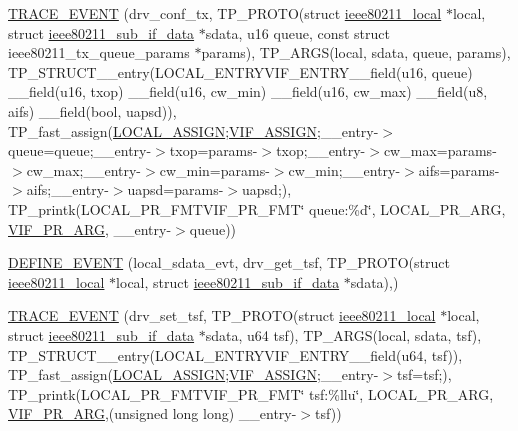 \begin{DoxyCompactItemize}
\item 
\hyperlink{driver-trace_8h_a265d8e79b7ac25833ed08a37b9bf0966}{T\-R\-A\-C\-E\-\_\-\-E\-V\-E\-N\-T} (drv\-\_\-conf\-\_\-tx, T\-P\-\_\-\-P\-R\-O\-T\-O(struct \hyperlink{structieee80211__local}{ieee80211\-\_\-local} $\ast$local, struct \hyperlink{structieee80211__sub__if__data}{ieee80211\-\_\-sub\-\_\-if\-\_\-data} $\ast$sdata, u16 queue, const struct ieee80211\-\_\-tx\-\_\-queue\-\_\-params $\ast$params), T\-P\-\_\-\-A\-R\-G\-S(local, sdata, queue, params), T\-P\-\_\-\-S\-T\-R\-U\-C\-T\-\_\-\-\_\-entry(L\-O\-C\-A\-L\-\_\-\-E\-N\-T\-R\-Y\-V\-I\-F\-\_\-\-E\-N\-T\-R\-Y\-\_\-\-\_\-field(u16, queue) \-\_\-\-\_\-field(u16, txop) \-\_\-\-\_\-field(u16, cw\-\_\-min) \-\_\-\-\_\-field(u16, cw\-\_\-max) \-\_\-\-\_\-field(u8, aifs) \-\_\-\-\_\-field(bool, uapsd)), T\-P\-\_\-fast\-\_\-assign(\hyperlink{driver-trace_8h_ab19d9141887ea92ef9640df06a51e0a1}{L\-O\-C\-A\-L\-\_\-\-A\-S\-S\-I\-G\-N};\hyperlink{driver-trace_8h_af5ede80f04ffcb3f644f68837b1d252c}{V\-I\-F\-\_\-\-A\-S\-S\-I\-G\-N};\-\_\-\-\_\-entry-\/$>$queue=queue;\-\_\-\-\_\-entry-\/$>$txop=params-\/$>$txop;\-\_\-\-\_\-entry-\/$>$cw\-\_\-max=params-\/$>$cw\-\_\-max;\-\_\-\-\_\-entry-\/$>$cw\-\_\-min=params-\/$>$cw\-\_\-min;\-\_\-\-\_\-entry-\/$>$aifs=params-\/$>$aifs;\-\_\-\-\_\-entry-\/$>$uapsd=params-\/$>$uapsd;), T\-P\-\_\-printk(L\-O\-C\-A\-L\-\_\-\-P\-R\-\_\-\-F\-M\-T\-V\-I\-F\-\_\-\-P\-R\-\_\-\-F\-M\-T\char`\"{} queue\-:\%d\char`\"{}, L\-O\-C\-A\-L\-\_\-\-P\-R\-\_\-\-A\-R\-G, \hyperlink{driver-trace_8h_a12c9f3afcd1c461f7ae2f86fd8503977}{V\-I\-F\-\_\-\-P\-R\-\_\-\-A\-R\-G}, \-\_\-\-\_\-entry-\/$>$queue))
\item 
\hyperlink{driver-trace_8h_ae6e1a3e3d22b2d68d7fc06995184e8b7}{D\-E\-F\-I\-N\-E\-\_\-\-E\-V\-E\-N\-T} (local\-\_\-sdata\-\_\-evt, drv\-\_\-get\-\_\-tsf, T\-P\-\_\-\-P\-R\-O\-T\-O(struct \hyperlink{structieee80211__local}{ieee80211\-\_\-local} $\ast$local, struct \hyperlink{structieee80211__sub__if__data}{ieee80211\-\_\-sub\-\_\-if\-\_\-data} $\ast$sdata),)
\item 
\hyperlink{driver-trace_8h_a750f24e8bcbbeb7ae5d18da826edb7b0}{T\-R\-A\-C\-E\-\_\-\-E\-V\-E\-N\-T} (drv\-\_\-set\-\_\-tsf, T\-P\-\_\-\-P\-R\-O\-T\-O(struct \hyperlink{structieee80211__local}{ieee80211\-\_\-local} $\ast$local, struct \hyperlink{structieee80211__sub__if__data}{ieee80211\-\_\-sub\-\_\-if\-\_\-data} $\ast$sdata, u64 tsf), T\-P\-\_\-\-A\-R\-G\-S(local, sdata, tsf), T\-P\-\_\-\-S\-T\-R\-U\-C\-T\-\_\-\-\_\-entry(L\-O\-C\-A\-L\-\_\-\-E\-N\-T\-R\-Y\-V\-I\-F\-\_\-\-E\-N\-T\-R\-Y\-\_\-\-\_\-field(u64, tsf)), T\-P\-\_\-fast\-\_\-assign(\hyperlink{driver-trace_8h_ab19d9141887ea92ef9640df06a51e0a1}{L\-O\-C\-A\-L\-\_\-\-A\-S\-S\-I\-G\-N};\hyperlink{driver-trace_8h_af5ede80f04ffcb3f644f68837b1d252c}{V\-I\-F\-\_\-\-A\-S\-S\-I\-G\-N};\-\_\-\-\_\-entry-\/$>$tsf=tsf;), T\-P\-\_\-printk(L\-O\-C\-A\-L\-\_\-\-P\-R\-\_\-\-F\-M\-T\-V\-I\-F\-\_\-\-P\-R\-\_\-\-F\-M\-T\char`\"{} tsf\-:\%llu\char`\"{}, L\-O\-C\-A\-L\-\_\-\-P\-R\-\_\-\-A\-R\-G, \hyperlink{driver-trace_8h_a12c9f3afcd1c461f7ae2f86fd8503977}{V\-I\-F\-\_\-\-P\-R\-\_\-\-A\-R\-G},(unsigned long long) \-\_\-\-\_\-entry-\/$>$tsf))

\end{DoxyCompactItemize}
